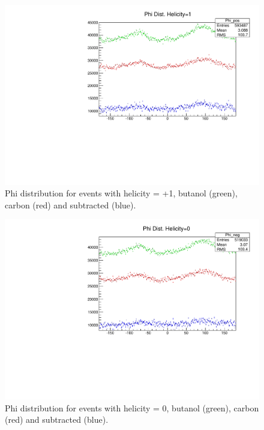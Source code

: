 \documentclass[a4paper,12pt]{article}
\begin{document}
\begin{figure}
\includegraphics[width=\textwidth]{Asym/Phi_h1_b4.pdf}
\caption{Phi distribution for events with helicity = +1, butanol (green), carbon (red) and subtracted (blue). }
\end{figure}

\begin{figure}
\includegraphics[width=\textwidth]{Asym/Phi_h0_b4.pdf}
\caption{Phi distribution for events with helicity = 0, butanol (green), carbon (red) and subtracted (blue). }
\end{figure}
\end{document}

